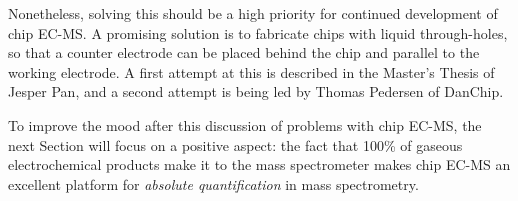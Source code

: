 Nonetheless, solving this should be a high priority for continued development of chip EC-MS. A promising solution is to fabricate chips with liquid through-holes, so that a counter electrode can be placed behind the chip and parallel to the working electrode. A first attempt at this is described in the Master's Thesis of Jesper Pan\cite{Pan2018_MSc}, and a second attempt is being led by Thomas Pedersen of DanChip.

To improve the mood after this discussion of problems with chip EC-MS, the next Section will focus on a positive aspect: the fact that 100\% of gaseous electrochemical products make it to the mass spectrometer makes chip EC-MS an excellent platform for \textit{absolute quantification} in mass spectrometry.